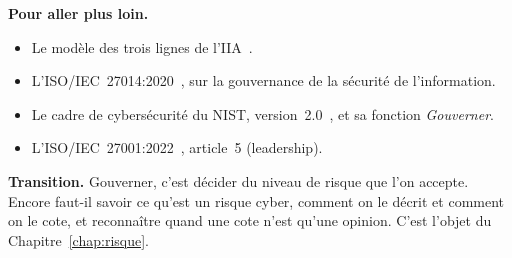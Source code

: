 \bigskip

\begin{boxinfo}
\textbf{Pour aller plus loin.}
\begin{itemize}
    \item Le modèle des trois lignes de l'IIA~\cite{iia2020troislignes}.
    \item L'ISO/IEC~27014:2020~\cite{iso27014_2020}, sur la gouvernance de
          la sécurité de l'information.
    \item Le cadre de cybersécurité du NIST, version~2.0~\cite{nist2024csf},
          et sa fonction \emph{Gouverner}.
    \item L'ISO/IEC~27001:2022~\cite{iso27001_2022}, article~5
          (leadership).
\end{itemize}
\end{boxinfo}

\begin{boxinfo}
\textbf{Transition.} Gouverner, c'est décider du niveau de risque que l'on
accepte. Encore faut-il savoir ce qu'est un risque cyber, comment on le
décrit et comment on le cote, et reconnaître quand une cote n'est qu'une
opinion. C'est l'objet du Chapitre~\ref{chap:risque}.
\end{boxinfo}
